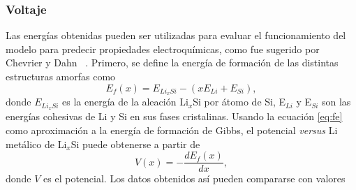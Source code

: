 \subsubsection{Voltaje}

\begin{table}[h]
    \centering
    \caption{Energías de formación obtenidas a través de la ecuación \ref{eq:fe}}
    \setlength\extrarowheight{2pt}
    \label{t:fe}
\end{table}
Las energías obtenidas pueden ser utilizadas para evaluar el funcionamiento del 
modelo para predecir propiedades electroquímicas, como fue sugerido por Chevrier
y Dahn ~\cite{chevrier2009}. Primero, se define la energía de formación de las 
distintas estructuras amorfas como
\begin{equation}\label{eq:fe}
    E_f(x) = E_{Li_xSi} - (x E_{Li} + E_{Si}),
\end{equation}
donde $E_{Li_xSi}$ es la energía de la aleación Li$_x$Si por átomo de Si, E$_{Li}$
y E$_{Si}$ son las energías cohesivas de Li y Si en sus fases cristalinas. Usando
la ecuación \ref{eq:fe} como aproximación a la energía de formación de Gibbs, el 
potencial \textit{versus} Li metálico de Li$_x$Si puede obtenerse a partir de
\begin{equation}\label{eq:voltaje}
    V(x) = - \frac{dE_f(x)}{dx},
\end{equation}
donde $V$ es el potencial. Los datos obtenidos así pueden compararse con valores
